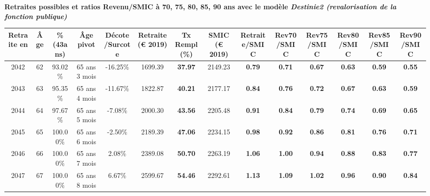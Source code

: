  \vspace{0.1cm} 
{\bf \noindent Retraites possibles et ratios Revenu/SMIC à 70, 75, 80, 85, 90 ans avec le modèle \emph{Destinie2 (revalorisation de la fonction publique)}}  
 
\begin{adjustbox}{max width=\textwidth} 
\begin{tabular}[htb]{|c|c||c|c|c||c|c||c||c|c|c|c|c|c|} 
\hline 
 Retraite en &  Âge &  \%(43ans) &  Âge pivot &  Décote/Surcote &  Retraite (\euro{} 2019) &  Tx Rempl(\%) &  SMIC (\euro{} 2019) &  Retraite/SMIC &  Rev70/SMIC &  Rev75/SMIC &  Rev80/SMIC &  Rev85/SMIC &  Rev90/SMIC \\ 
\hline \hline 
 2042 &  62 &  93.02\% &  65 ans 3 mois &  -16.25\% &  1699.39 &  {\bf 37.97} &  2149.23 &  {\bf {\color{red} 0.79}} &  {\bf {\color{red} 0.71}} &  {\bf {\color{red} 0.67}} &  {\bf {\color{red} 0.63}} &  {\bf {\color{red} 0.59}} &  {\bf {\color{red} 0.55}} \\ 
\hline 
 2043 &  63 &  95.35\% &  65 ans 4 mois &  -11.67\% &  1822.87 &  {\bf 40.21} &  2177.17 &  {\bf {\color{red} 0.84}} &  {\bf {\color{red} 0.76}} &  {\bf {\color{red} 0.72}} &  {\bf {\color{red} 0.67}} &  {\bf {\color{red} 0.63}} &  {\bf {\color{red} 0.59}} \\ 
\hline 
 2044 &  64 &  97.67\% &  65 ans 5 mois &  -7.08\% &  2000.30 &  {\bf 43.56} &  2205.48 &  {\bf {\color{red} 0.91}} &  {\bf {\color{red} 0.84}} &  {\bf {\color{red} 0.79}} &  {\bf {\color{red} 0.74}} &  {\bf {\color{red} 0.69}} &  {\bf {\color{red} 0.65}} \\ 
\hline 
 2045 &  65 &  100.00\% &  65 ans 6 mois &  -2.50\% &  2189.39 &  {\bf 47.06} &  2234.15 &  {\bf {\color{red} 0.98}} &  {\bf {\color{red} 0.92}} &  {\bf {\color{red} 0.86}} &  {\bf {\color{red} 0.81}} &  {\bf {\color{red} 0.76}} &  {\bf {\color{red} 0.71}} \\ 
\hline 
 2046 &  66 &  100.00\% &  65 ans 7 mois &  2.08\% &  2389.08 &  {\bf 50.70} &  2263.19 &  {\bf 1.06} &  {\bf 1.00} &  {\bf {\color{red} 0.94}} &  {\bf {\color{red} 0.88}} &  {\bf {\color{red} 0.83}} &  {\bf {\color{red} 0.77}} \\ 
\hline 
 2047 &  67 &  100.00\% &  65 ans 8 mois &  6.67\% &  2599.67 &  {\bf 54.46} &  2292.61 &  {\bf 1.13} &  {\bf 1.09} &  {\bf 1.02} &  {\bf {\color{red} 0.96}} &  {\bf {\color{red} 0.90}} &  {\bf {\color{red} 0.84}} \\ 
\hline 
\hline 
\end{tabular} 
\end{adjustbox} 
 
